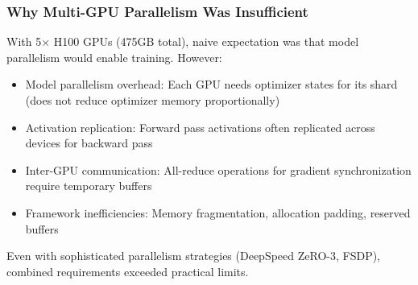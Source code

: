\subsubsection{Why Multi-GPU Parallelism Was Insufficient}

With 5× H100 GPUs (475GB total), naive expectation was that model parallelism would enable training. However:
\begin{itemize}
\item Model parallelism overhead: Each GPU needs optimizer states for its shard (does not reduce optimizer memory proportionally)
\item Activation replication: Forward pass activations often replicated across devices for backward pass
\item Inter-GPU communication: All-reduce operations for gradient synchronization require temporary buffers
\item Framework inefficiencies: Memory fragmentation, allocation padding, reserved buffers
\end{itemize}

Even with sophisticated parallelism strategies (DeepSpeed ZeRO-3, FSDP), combined requirements exceeded practical limits.
